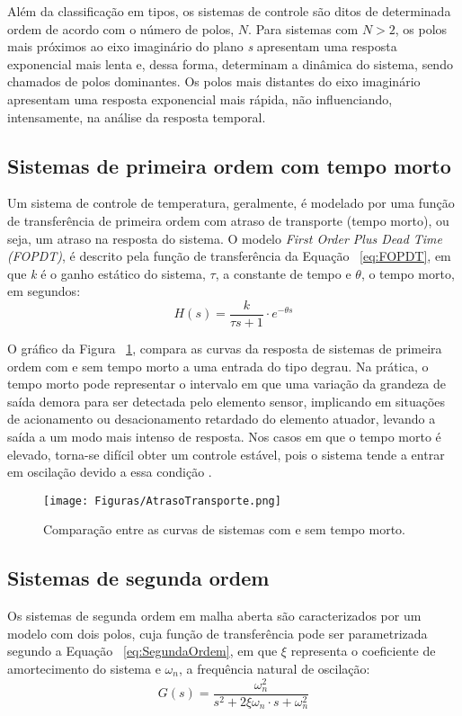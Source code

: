         Além da classificação em tipos, os sistemas de controle são ditos de determinada ordem de acordo com o número de polos, $N$. Para sistemas com $N > 2$, os polos mais próximos ao eixo imaginário do plano \textit{s} apresentam uma resposta exponencial mais lenta e, dessa forma, determinam a dinâmica do sistema, sendo chamados de polos dominantes. Os polos mais distantes do eixo imaginário apresentam uma resposta exponencial mais rápida, não influenciando, intensamente, na análise da resposta temporal.
    \subsection{Sistemas de primeira ordem com tempo morto}
        Um sistema de controle de temperatura, geralmente, é modelado por uma função de transferência de primeira ordem com atraso de transporte (tempo morto), ou seja, um atraso na resposta do sistema. O modelo \textit{First Order Plus Dead Time (FOPDT)}, é descrito pela função de transferência da Equação ~\ref{eq:FOPDT}, em que \textit{k} é o ganho estático do sistema, $\tau$, a constante de tempo e $\theta$, o tempo morto, em segundos:
        \begin{equation}
            \label{eq:FOPDT}
            H(s) = \dfrac{k}{\tau s + 1} \cdot e^{-\theta s}
        \end{equation}
        
        O gráfico da Figura ~\ref{fig:GraficoAtraso}, compara as curvas da resposta de sistemas de primeira ordem com e sem tempo morto a uma entrada do tipo degrau. Na prática, o tempo morto pode representar o intervalo em que uma variação da grandeza de saída demora para ser detectada pelo elemento sensor, implicando em situações de acionamento ou desacionamento retardado do elemento atuador, levando a saída a um modo mais intenso de resposta. Nos casos em que o tempo morto é elevado, torna-se difícil obter um controle estável, pois o sistema tende a entrar em oscilação devido a essa condição \cite{ApostilaME}.  
        \begin{figure}[H]
            \centering
            \texttt{[image: Figuras/AtrasoTransporte.png]}
            \caption{Comparação entre as curvas de sistemas com e sem tempo morto.} \label{fig:GraficoAtraso} 
        \end{figure}
    \subsection{Sistemas de segunda ordem}
        Os sistemas de segunda ordem em malha aberta são caracterizados por um modelo com dois polos, cuja função de transferência pode ser parametrizada segundo a Equação ~\ref{eq:SegundaOrdem}, em que $\xi$ representa o coeficiente de amortecimento do sistema e $\omega _n$, a frequência natural de oscilação:
        \begin{equation}
            \label{eq:SegundaOrdem}
            G(s) = \dfrac{\omega _n ^2}{s^2+2 \xi \omega _n \cdot s + \omega _n ^2}
        \end{equation}
        
